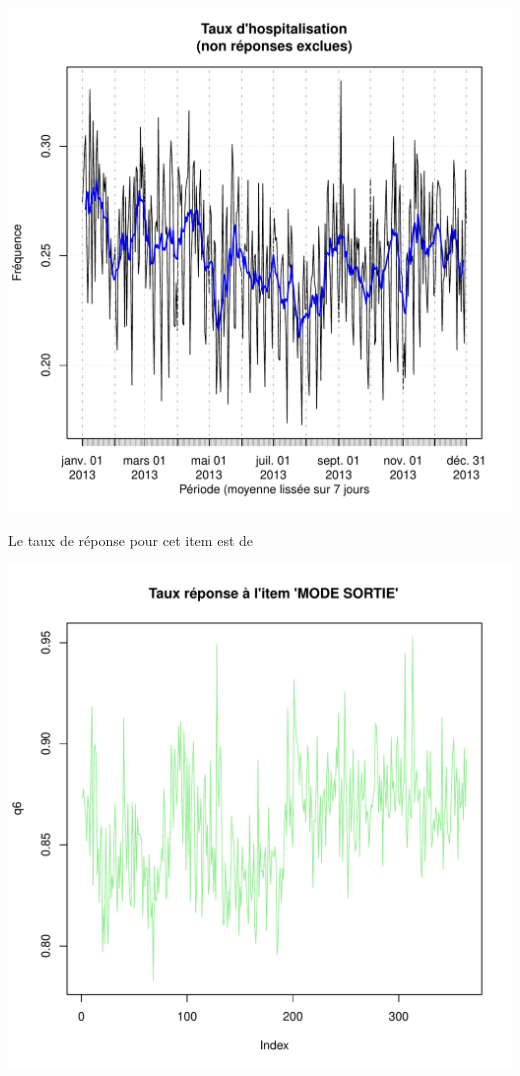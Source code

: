 \documentclass[12pt,english,french,twoside]{book}\usepackage[]{graphicx}\usepackage[]{color}
\makeatletter
\def\maxwidth{ %
  \ifdim\Gin@nat@width>\linewidth
    \linewidth
  \else
    \Gin@nat@width
  \fi
}
\makeatother
\begin{document}
\includegraphics[width=\maxwidth]{figure/hospit} 




Le taux de réponse pour cet item est de

\includegraphics[width=\maxwidth]{figure/retour_dom3} 
\end{document}
